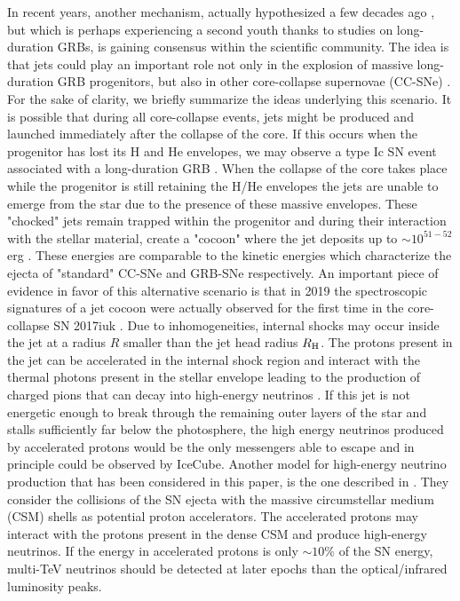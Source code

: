 \documentclass[twocolumn]{aastex631}
\begin{document}
In recent years, another mechanism, actually hypothesized a few decades ago \citep{Bisnovatyi1970,LeBlanc1970,Ostriker1971}, but which is perhaps experiencing a second youth thanks to studies on long-duration GRBs, is gaining consensus within the scientific community. The idea is that jets could play an important role not only in the explosion of massive long-duration GRB progenitors, but also in other core-collapse supernovae (CC-SNe) \citep{Piran2019,Soker22}. For the sake of clarity, we briefly summarize the ideas underlying this scenario.  It is possible that during all core-collapse events, jets might be produced and launched immediately after the collapse of the core. If this occurs when the progenitor has lost its H and He envelopes, we may observe a type Ic SN event associated with a long-duration GRB \citep{Meszaros2001Jet,Woosley2006,Hjorth011}. When the collapse of the core takes place while the progenitor is still retaining the H/He envelopes the jets are unable to emerge from the star due to the presence of these massive envelopes. These "chocked" jets remain trapped within the progenitor and  during their interaction with the stellar material, create a "cocoon" where the jet deposits up to $\sim 10^{51-52}$ erg \citep{Nakar2017}. These energies are comparable to the kinetic energies which characterize the ejecta of "standard" CC-SNe and GRB-SNe respectively. An important piece of evidence in favor of this alternative scenario is that in 2019 the spectroscopic signatures of a jet cocoon were actually observed for the first time in the core-collapse SN 2017iuk \citep{Izzo2019}. 
Due to inhomogeneities, internal shocks may occur  inside the jet at a radius $R$ smaller than the jet head radius $ R_{\rm H}$. The protons present in the jet can be accelerated in the internal  shock region and interact with the thermal photons present in the stellar envelope leading to the production of charged pions that can decay into high-energy neutrinos \citep{Meszaros2001Jet}. If this jet is not energetic enough to break through the remaining outer layers of the star and stalls sufficiently far below the photosphere, the high energy neutrinos produced by accelerated protons would be the only messengers able to escape \citep{Senno2016,Murase2016,He2018,Guetta2020,Fasano2021} and in principle could be observed by IceCube. Another model for high-energy neutrino production that has been considered in this paper, is the one described in \cite{Murase2011}. They consider the collisions of the SN ejecta with the massive circumstellar medium (CSM) shells as potential proton accelerators. The accelerated protons may interact with the protons present in the dense CSM and produce high-energy neutrinos. If the energy in accelerated protons is only $\sim 10\%$ of the SN energy,  multi-TeV neutrinos should be detected at later epochs than the optical/infrared luminosity peaks.
\end{document}
